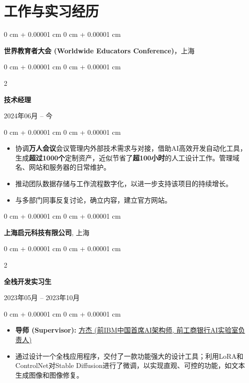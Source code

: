 \documentclass[10pt, letterpaper]{article}
\newenvironment{highlights}{
    \begin{itemize}[
        topsep=0.05 cm,
        parsep=0.05 cm,
        partopsep=0pt,
        itemsep=0pt,
        leftmargin=0.4 cm + 10pt
    ]
}{
    \end{itemize}
} %
\newenvironment{onecolentry}{
    \begin{adjustwidth}{
        0 cm + 0.00001 cm
    }{
        0 cm + 0.00001 cm
    }
}{
    \end{adjustwidth}
} %
\newenvironment{twocolentry}[2][]{
    \onecolentry
    \def\secondColumn{#2}
    \setcolumnwidth{\fill, 4.5 cm}
    \begin{paracol}{2}
}{
    \switchcolumn \raggedleft \secondColumn
    \end{paracol}
    \endonecolentry
} %
\begin{document}
\section{工作与实习经历}

    \begin{onecolentry}
        \large\textbf{世界教育者大会 (Worldwide Educators Conference)}，上海
    \end{onecolentry}
    \begin{twocolentry}{
        2024年06月 – 今
    }
        \textbf{技术经理}
    \end{twocolentry}
    \begin{onecolentry}
        \begin{highlights}
            \item 协调\textbf{万人会议}会议管理内外部技术需求与对接，借助AI高效开发自动化工具，生成\textbf{超过1000个}定制资产，近似节省了\textbf{超100小时}的人工设计工作。管理域名、网站和服务器的日常维护。
            \item 推动团队数据存储与工作流程数字化，以进一步支持该项目的持续增长。
            \item 与多部门同事反复讨论，确立内容，建立官方网站。\href{https://www.wwec820.com}{\faLink}
        \end{highlights}
    \end{onecolentry}
    
    \vspace{0.2 cm}

    \begin{onecolentry}
         \large\textbf{上海启元科技有限公司}, 上海
    \end{onecolentry}
    \begin{twocolentry}{
        2023年05月 – 2023年10月
    }
       \textbf{全栈开发实习生}
    \end{twocolentry}
    \begin{onecolentry}
        \begin{highlights}
            \item \textbf{导师 (Supervisor):} \href{https://www.linkedin.com/in/jie-fang-28293740}{方杰 (前IBM中国首席AI架构师, 前工商银行AI实验室负责人)}
            \item 通过设计一个全栈应用程序，交付了一款功能强大的设计工具；利用LoRA和ControlNet对Stable Diffusion进行了微调，以实现直观、可控的功能，如文本生成图像和图像修复。
        \end{highlights}
    \end{onecolentry}
\end{document}
